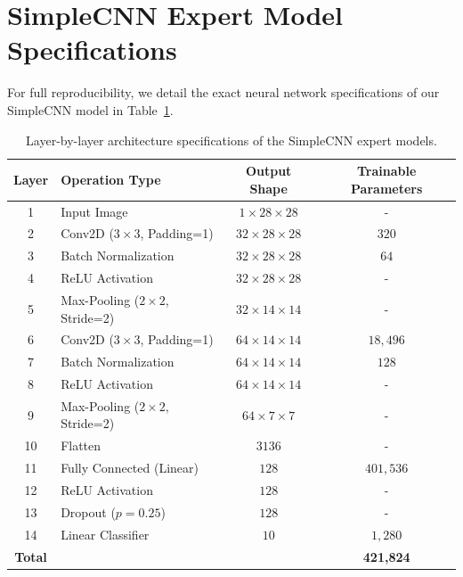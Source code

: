 \documentclass{article}
\theoremstyle{plain}
\theoremstyle{definition}
\theoremstyle{remark}
\begin{document}
\clearpage



\newpage
\appendix
\onecolumn
\section{SimpleCNN Expert Model Specifications}
For full reproducibility, we detail the exact neural network specifications of our SimpleCNN model in Table~\ref{tab:specs}.
\begin{table}[H]
  \caption{Layer-by-layer architecture specifications of the SimpleCNN expert models.}
  \label{tab:specs}
  \vskip 0.1in
  \begin{center}
    \begin{small}
      \begin{tabular}{c|l|c|c}
        \toprule
        Layer & Operation Type & Output Shape & Trainable Parameters \\
        \midrule
        1 & Input Image & $1 \times 28 \times 28$ & - \\
        2 & Conv2D ($3 \times 3$, Padding=1) & $32 \times 28 \times 28$ & $320$ \\
        3 & Batch Normalization & $32 \times 28 \times 28$ & $64$ \\
        4 & ReLU Activation & $32 \times 28 \times 28$ & - \\
        5 & Max-Pooling ($2 \times 2$, Stride=2) & $32 \times 14 \times 14$ & - \\
        6 & Conv2D ($3 \times 3$, Padding=1) & $64 \times 14 \times 14$ & $18,496$ \\
        7 & Batch Normalization & $64 \times 14 \times 14$ & $128$ \\
        8 & ReLU Activation & $64 \times 14 \times 14$ & - \\
        9 & Max-Pooling ($2 \times 2$, Stride=2) & $64 \times 7 \times 7$ & - \\
        10 & Flatten & $3136$ & - \\
        11 & Fully Connected (Linear) & $128$ & $401,536$ \\
        12 & ReLU Activation & $128$ & - \\
        13 & Dropout ($p=0.25$) & $128$ & - \\
        14 & Linear Classifier & $10$ & $1,280$ \\
        \midrule
        \textbf{Total} & & & \textbf{421,824} \\
        \bottomrule
      \end{tabular}
    \end{small}
  \end{center}
\end{table}
\end{document}
